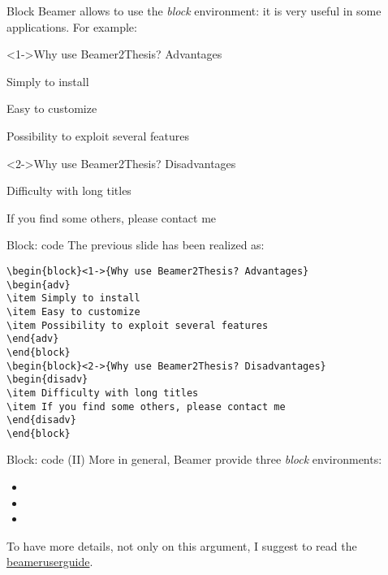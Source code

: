 \begin{tframe}{Block}
Beamer allows to use the \emph{block} environment: it is very useful in some applications. For example:
\begin{block}<1->{Why use Beamer2Thesis? Advantages}
\begin{adv}
\item Simply to install
\item Easy to customize
\item Possibility to exploit several features
\end{adv}
\end{block}
\begin{block}<2->{Why use Beamer2Thesis? Disadvantages}
\begin{disadv}
\item Difficulty with long titles
\item If you find some others, please contact me 
\end{disadv}
\end{block}
\end{tframe}

\begin{frame}[t,fragile]{Block: code}
The previous slide has been realized as:
\small{\begin{verbatim}
\begin{block}<1->{Why use Beamer2Thesis? Advantages}
\begin{adv}
\item Simply to install
\item Easy to customize
\item Possibility to exploit several features
\end{adv}
\end{block}
\begin{block}<2->{Why use Beamer2Thesis? Disadvantages}
\begin{disadv}
\item Difficulty with long titles
\item If you find some others, please contact me 
\end{disadv}
\end{block}
\end{verbatim}}
\end{frame}

\begin{frame}[t,fragile]{Block: code (II)}
More in general, Beamer provide three \emph{block} environments:
\begin{itemize}
\item {}
\item {}
\item {}
\end{itemize}
To have more details, not only on this argument, I suggest to read the \href{http://mirrors.ctan.org/macros/latex/contrib/beamer/doc/beameruserguide.pdf}{beameruserguide}.
\end{frame}
